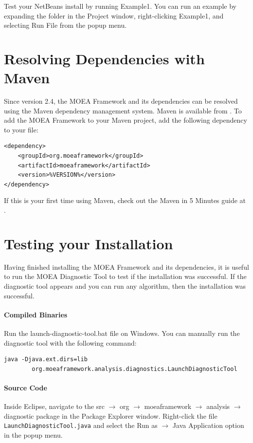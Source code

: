 Test your NetBeans install by running Example1.  You can run an example by expanding the  folder in the Project window, right-clicking Example1, and selecting Run File from the popup menu.

\section{Resolving Dependencies with Maven}
Since version 2.4, the MOEA Framework and its dependencies can be resolved using the Maven dependency management system.  Maven is available from .  To add the MOEA Framework to your Maven project, add the following dependency to your  file:

\begin{lstlisting}[language=Plaintext]
<dependency>
	<groupId>org.moeaframework</groupId>
	<artifactId>moeaframework</artifactId>
	<version>%VERSION%</version>
</dependency>
\end{lstlisting}

If this is your first time using Maven, check out the Maven in 5 Minutes guide at .

\section{Testing your Installation}
Having finished installing the MOEA Framework and its dependencies, it is useful to run the MOEA Diagnostic Tool to test if the installation was successful.  If the diagnostic tool appears and you can run any algorithm, then the installation was successful.

\paragraph{Compiled Binaries}
Run the launch-diagnostic-tool.bat file on Windows.  You can manually run the diagnostic tool with the following command:

\begin{lstlisting}[language=Plaintext]
java -Djava.ext.dirs=lib
		org.moeaframework.analysis.diagnostics.LaunchDiagnosticTool
\end{lstlisting}

\paragraph{Source Code}
Inside Eclipse, navigate to the src $\rightarrow$ org $\rightarrow$ moeaframework $\rightarrow$ analysis $\rightarrow$ diagnostic package in the Package Explorer window.  Right-click the file \texttt{LaunchDiagnosticTool.java} and select the Run as $\rightarrow$ Java Application option in the popup menu.

